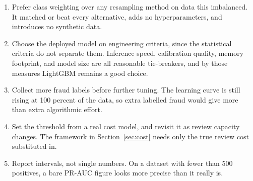 \begin{enumerate}
  \item Prefer class weighting over any resampling method on data this imbalanced.
        It matched or beat every alternative, adds no hyperparameters, and introduces no
        synthetic data.
  \item Choose the deployed model on engineering criteria, since the statistical
        criteria do not separate them. Inference speed, calibration quality, memory
        footprint, and model size are all reasonable tie-breakers, and by those measures
        LightGBM remains a good choice.
  \item Collect more fraud labels before further tuning. The learning curve is
        still rising at 100 percent of the data, so extra labelled fraud would give more
        than extra algorithmic effort.
  \item Set the threshold from a real cost model, and revisit it as review capacity
        changes. The framework in Section~\ref{sec:cost} needs only the true review cost
        substituted in.
  \item Report intervals, not single numbers. On a dataset with fewer than 500
        positives, a bare PR-AUC figure looks more precise than it really is.
\end{enumerate}
